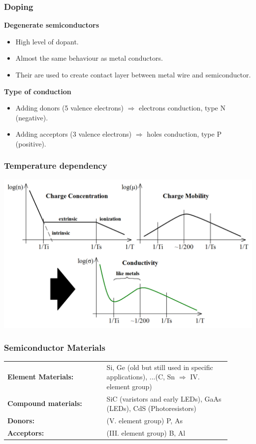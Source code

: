 \documentclass{beamer}
\begin{document}
	\begin{frame}
    \frametitle{Doping}
		\small
		
		\textbf{Degenerate semiconductors}
		
		\begin{itemize}
			\item High level of dopant.
			\item Almost the same behaviour as metal conductors.
			\item Their are used to create contact layer between metal wire and semiconductor.
		\end{itemize}
		
		\textbf{Type of conduction}
		
		\begin{itemize}
			\item Adding donors (5 valence electrons) $\Rightarrow$ electrons conduction, type N (negative).
			\item Adding acceptors (3 valence electrons) $\Rightarrow$ holes conduction, type P (positive).
		\end{itemize}
	\end{frame}
	\begin{frame}
    \frametitle{Temperature dependency}
		\begin{center}
			\includegraphics[scale=0.25]{obr02_tepZav.png}
		\end{center}
	\end{frame}
	\begin{frame}
    \frametitle{Semiconductor Materials}
		\begin{center}
			\begin{tabular}{p{0.4\linewidth} p{0.5\linewidth}}
			\textbf{Element Materials:} & Si, Ge (old but still used in specific applications), ...(C, Sn $\Rightarrow$ IV. element group)\\
			\textbf{Compound materials:} & SiC (varistors and early LEDs), GaAs (LEDs), CdS (Photoresistors)\\
			\textbf{Donors:} & (V. element group) P, As\\
			\textbf{Acceptors:} & (III. element group) B, Al\\
			\end{tabular}
		\end{center}
	\end{frame}
\end{document}
